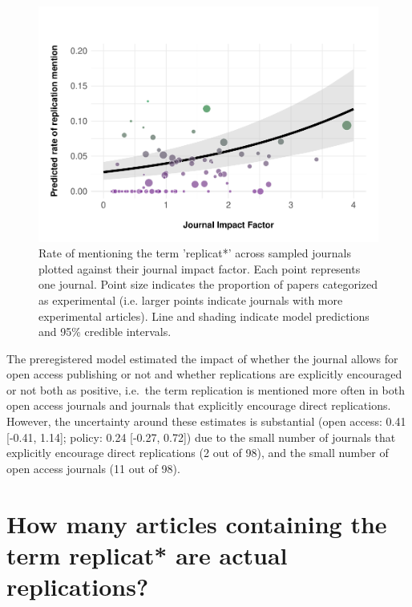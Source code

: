 \documentclass[]{elsarticle} %
\begin{document}
\begin{figure}

{\centering \includegraphics[width=1\linewidth]{ReplicationLing_files/figure-latex/plot-mention-jif-1} 

}

\caption{Rate of mentioning the term 'replicat*' across sampled journals plotted against their journal impact factor. Each point represents one journal. Point size indicates the proportion of papers categorized as experimental (i.e. larger points indicate journals with more experimental articles). Line and shading indicate model predictions and 95\% credible intervals.}\label{fig:plot-mention-jif}
\end{figure}

The preregistered model estimated the impact of whether the journal allows for open access publishing or not and whether replications are explicitly encouraged or not both as positive, i.e.~the term replication is mentioned more often in both open access journals and journals that explicitly encourage direct replications. However, the uncertainty around these estimates is substantial (open access: 0.41 {[}-0.41, 1.14{]}; policy: 0.24 {[}-0.27, 0.72{]}) due to the small number of journals that explicitly encourage direct replications (2 out of 98), and the small number of open access journals (11 out of 98).

\hypertarget{how-many-articles-containing-the-term-replicat-are-actual-replications}{%
\section{How many articles containing the term replicat* are actual replications?}\label{how-many-articles-containing-the-term-replicat-are-actual-replications}}
\end{document}
